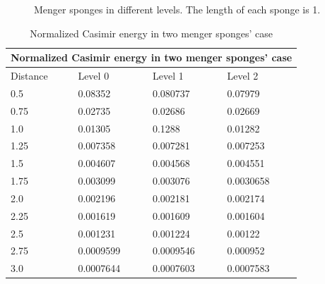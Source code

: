 \begin{figure}[H]
    \centering
    \qquad
    \qquad
    \caption{Menger sponges in different levels. The length of each sponge is 1.}
    \label{Menger sponges}
\end{figure}

\begin{table}[H]
    \centering
    \begin{tabular}{ |p{2cm}||p{2cm}|p{2cm}|p{2cm}|  }
        \hline
        \multicolumn{4}{|c|}{Normalized Casimir energy in two menger sponges' case} \\
        \hline
        Distance & Level 0 & Level 1 & Level 2\\
        \hline
        0.5   & 0.08352    & 0.080737    & 0.07979\\
        0.75  & 0.02735    & 0.02686     & 0.02669\\
        1.0   & 0.01305    & 0.1288      & 0.01282\\
        1.25  & 0.007358   & 0.007281    & 0.007253\\
        1.5   & 0.004607   & 0.004568    & 0.004551\\
        1.75  & 0.003099   & 0.003076    & 0.0030658\\
        2.0   & 0.002196   & 0.002181    & 0.002174\\
        2.25  & 0.001619   & 0.001609    & 0.001604\\
        2.5   & 0.001231   & 0.001224    & 0.00122\\
        2.75  & 0.0009599  & 0.0009546   & 0.000952\\
        3.0   & 0.0007644  & 0.0007603   & 0.0007583\\
        \hline
       \end{tabular}
       \caption{\label{Normalized Casimir energy in two menger sponges' case} Normalized Casimir energy in two menger sponges' case}
    \end{table}

